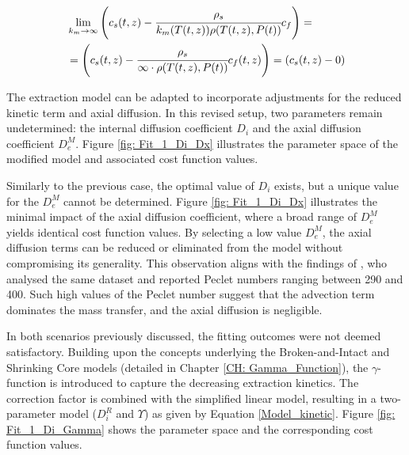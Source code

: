 \documentclass[../Supercritical_fluid_extraction_of_essential_oil_from_chamomile.tex]{subfiles}
\begin{document}
	{\footnotesize
		\begin{equation*}
			\begin{split}
				&\lim_{k_m \rightarrow \infty} \left({\color{black}{\color{black} c_s} }(t,z)  - \cfrac{{\color{black}\rho_s}}{{\color{black}k_m}(T(t,z)){\color{black}\rho}(T(t,z),{\color{black}P}(t))}  c_f \right)  = \\
				&= \left({\color{black}{\color{black} c_s} }(t,z)  - \cfrac{\rho_s}{\infty \cdot \rho(T(t,z),P(t))}  {c_f}(t,z) \right) = \left(c_s(t,z) - 0 \right)
			\end{split}
	\end{equation*} }
	
	The extraction model can be adapted to incorporate adjustments for the reduced kinetic term and axial diffusion. In this revised setup, two parameters remain undetermined: the internal diffusion coefficient $D_i$ and the axial diffusion coefficient $D_e^M$. Figure \ref{fig: Fit_1_Di_Dx} illustrates the parameter space of the modified model and associated cost function values.
		
	Similarly to the previous case, the optimal value of $D_i$ exists, but a unique value for the $D_e^M$ cannot be determined. Figure \ref{fig: Fit_1_Di_Dx} illustrates the minimal impact of the axial diffusion coefficient, where a broad range of $D_e^M$ yields identical cost function values. By selecting a low value $D_e^M$, the axial diffusion terms can be reduced or eliminated from the model without compromising its generality. This observation aligns with the findings of \citet{Rahimi2011}, who analysed the same dataset and reported Peclet numbers ranging between 290 and 400. Such high values of the Peclet number suggest that the advection term dominates the mass transfer, and the axial diffusion is negligible.
	
	In both scenarios previously discussed, the fitting outcomes were not deemed satisfactory. Building upon the concepts underlying the Broken-and-Intact and Shrinking Core models (detailed in Chapter \ref{CH: Gamma_Function}), the $\gamma$-function is introduced to capture the decreasing extraction kinetics. The correction factor is combined with the simplified linear model, resulting in a two-parameter model ($D_i^R$ and $\Upsilon$) as given by Equation \ref{Model_kinetic}. Figure \ref{fig: Fit_1_Di_Gamma} shows the parameter space and the corresponding cost function values.
		
\end{document}
